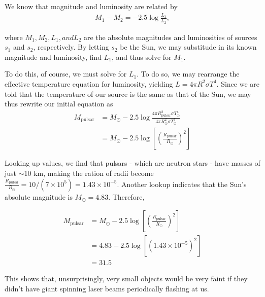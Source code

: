 \documentclass[12pt]{article}
\newenvironment{answer}[2][Answer]{\begin{trivlist}
\item[\hskip \labelsep {\bfseries #1}\hskip \labelsep {\bfseries #2.}]}{\end{trivlist}}
\begin{document}
\begin{itemize}
\begin{answer}{6}
  We know that magnitude and luminosity are related by
  \begin{align*}
    M_1 - M_2 = -2.5 \log{\frac{L_1}{L_2}},
  \end{align*}

  where $M_1, M_2, L_1, and L_2$ are the absolute magnitudes and luminosities of sources $s_1$ and $s_2$, respectively. By letting $s_2$ be the Sun, we may substitude in its known magnitude and luminosity, find $L_1$, and thus solve for $M_1$.

  To do this, of course, we must solve for $L_1$. To do so, we may rearrange the effective temperature equation for luminosity, yielding $L = 4 \pi R^2 \sigma T^4$. Since we are told that the temperature of our source is the same as that of the Sun, we may thus rewrite our initial equation as
  \begin{align*}
    M_{\text{pulsar}} &= M_\odot -2.5 \log{\frac{4 \pi R_{\text{pulsar}}^2 \sigma T_{\odot}^4}{4 \pi R_{\odot}^2 \sigma T_{\odot}^4}} \\
        &= M_\odot -2.5 \log{\left[\left(\frac{R_\text{pulsar}}{R_{\odot}}\right)^2 \right]}
  \end{align*}

Looking up values, we find that pulsars - which are neutron stars - have masses of just $\sim$10 km, making the ration of radii become $\frac{R_\text{pulsar}}{R_{\odot}} = 10/(7 \times 10^5) = 1.43 \times 10^{-5}$. Another lookup indicates that the Sun's absolute magnitude is $M_\odot = 4.83$. Therefore,

\begin{align*}
  M_{\text{pulsar}} &= M_\odot -2.5 \log{\left[\left(\frac{R_\text{pulsar}}{R_{\odot}}\right)^2 \right]} \\
  &= 4.83 -2.5 \log{\left[\left(1.43 \times 10^{-5}\right)^2 \right]} \\
  &= 31.5
\end{align*}

This shows that, unsurprisingly, very small objects would be very faint if they didn't have giant spinning laser beams periodically flashing at us.
\end{answer}




\end{itemize}
\end{document}
